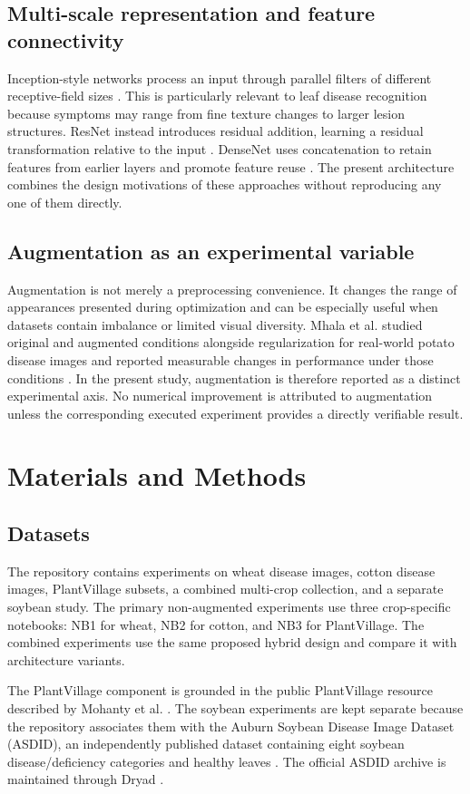 \documentclass[a4paper,fleqn]{cas-dc}
\begin{document}
\subsection{Multi-scale representation and feature connectivity}
Inception-style networks process an input through parallel filters of different receptive-field sizes \cite{szegedy2015}. This is particularly relevant to leaf disease recognition because symptoms may range from fine texture changes to larger lesion structures. ResNet instead introduces residual addition, learning a residual transformation relative to the input \cite{he2016}. DenseNet uses concatenation to retain features from earlier layers and promote feature reuse \cite{huang2017}. The present architecture combines the design motivations of these approaches without reproducing any one of them directly.

\subsection{Augmentation as an experimental variable}
Augmentation is not merely a preprocessing convenience. It changes the range of appearances presented during optimization and can be especially useful when datasets contain imbalance or limited visual diversity. Mhala et al. studied original and augmented conditions alongside regularization for real-world potato disease images and reported measurable changes in performance under those conditions \cite{mhala2025}. In the present study, augmentation is therefore reported as a distinct experimental axis. No numerical improvement is attributed to augmentation unless the corresponding executed experiment provides a directly verifiable result.

\section{Materials and Methods}
\subsection{Datasets}
The repository contains experiments on wheat disease images, cotton disease images, PlantVillage subsets, a combined multi-crop collection, and a separate soybean study. The primary non-augmented experiments use three crop-specific notebooks: NB1 for wheat, NB2 for cotton, and NB3 for PlantVillage. The combined experiments use the same proposed hybrid design and compare it with architecture variants.

The PlantVillage component is grounded in the public PlantVillage resource described by Mohanty et al. \cite{mohanty2016}. The soybean experiments are kept separate because the repository associates them with the Auburn Soybean Disease Image Dataset (ASDID), an independently published dataset containing eight soybean disease/deficiency categories and healthy leaves \cite{bevers2022}. The official ASDID archive is maintained through Dryad \cite{dryad2022}.
\end{document}
